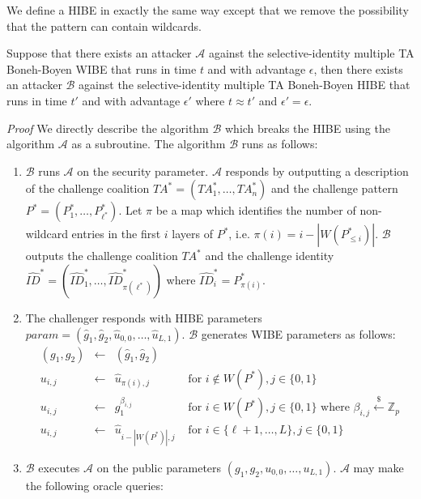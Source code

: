 \documentclass[10pt]{llncs}
\newcommand{\A}{\mathcal{A}}
\newcommand{\B}{\mathcal{B}}
\newcommand{\ID}{\mathit{ID}}
\newcommand{\TA}{\mathit{TA}}
\newcommand{\getsr}{\stackrel{{\scriptscriptstyle\$}}{\gets}}
\begin{document}
We define a HIBE in exactly the same way except that we remove the possibility that the pattern can contain wildcards.

\begin{theorem}
Suppose that there exists an attacker $\A$ against the selective-identity multiple TA Boneh-Boyen WIBE that runs in time $t$ and with advantage $\epsilon$, then there exists an attacker $\B$ against the selective-identity multiple TA Boneh-Boyen HIBE that runs in time $t'$ and with advantage $\epsilon'$ where $t \approx t'$ and $\epsilon' = \epsilon$.
\end{theorem}
\emph{Proof} We directly describe the algorithm $\B$ which breaks the HIBE using the algorithm $\A$ as a subroutine. The algorithm $\B$ runs as follows:
\begin{enumerate}
\item $\B$ runs $\A$ on the security parameter. $\A$ responds by outputting a description of the challenge coalition $\TA^{*} = (\TA^{*}_{1},\ldots,\TA^{*}_{n})$ and the challenge pattern $P^{*} = (P^{*}_{1},\ldots,P^{*}_{\ell^{*}})$. Let $\pi$ be a map which identifies the number of non-wildcard entries in the first $i$ layers of $P^{*}$, i.e. $\pi(i) = i - |W(P^{*}_{\leq i})|$. $\B$ outputs the challenge coalition $\TA^{*}$ and the challenge identity $\hat{\ID}^{*}=(\hat{\ID}^{*}_{1},\ldots,\hat{\ID}^{*}_{\pi(\ell^{*})})$ where $\hat{\ID}^{*}_{i} = P^{*}_{\pi(i)}$.
\item The challenger responds with HIBE parameters $\mathit{param} = (\hat{g}_{1},\hat{g}_{2},\hat{u}_{0,0},\ldots,\hat{u}_{L,1})$. $\B$ generates WIBE parameters as follows:
	\begin{displaymath}
	\begin{array}{rcll}
	(g_{1},g_{2}) &\gets& (\hat{g}_{1},\hat{g}_{2})&\\
	u_{i,j} &\gets& \hat{u}_{\pi(i),j} &\mbox{ for } i\notin W(P^{*}), j\in\{0,1\}\\
	u_{i,j} &\gets& g_{1}^{\beta_{i,j}} &\mbox{ for } i\in W(P^{*}), j\in\{0,1\}\mbox{ where } \beta_{i,j}\getsr \mathbb{Z}_{p}\\
	u_{i,j} &\gets& \hat{u}_{i-|W(P^{*})|,j} &\mbox{ for } i\in \{\ell+1,\ldots,L\}, j\in\{0,1\}
	\end{array}
	\end{displaymath}
\item $\B$ executes $\A$ on the public parameters $(g_{1},g_{2},u_{0,0},\ldots,u_{L,1})$. $\A$ may make the following oracle queries:
	\begin{itemize}

\end{itemize}
\end{enumerate}
\end{document}
